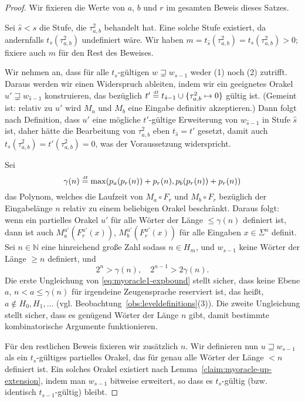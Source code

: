 \begin{proof}
Wir fixieren die Werte von $a$, $b$ und $r$ im gesamten Beweis dieses Satzes.

Sei $\hat{s} < s$ die Stufe, die $\tau^2_{a,b}$ behandelt hat.
Eine solche Stufe existiert, da andernfalls $t_{s}(\tau^2_{a,b})$ undefiniert wäre.
Wir haben $m = t_{\hat{s}}(\tau^2_{a,b}) = t_{s}(\tau^2_{a,b})>0$; fixiere auch $m$ für den Rest des Beweises.

Wir nehmen an, dass für alle $t_{s}$-gültigen $w\sqsupsetneq w_{s-1}$ weder (1) noch (2) zutrifft.
Daraus werden wir einen Widerspruch ableiten, indem wir ein geeignetes Orakel $u'\sqsupsetneq w_{\hat{s}-1}$ konstruieren, das bezüglich $t' \stackrel{\text{{\normalfont\tiny df}}}{=}  t_{\hat{s}-1}\cup \{\tau^2_{a,b}\mapsto 0\}$ gültig ist. (Gemeint ist: relativ zu $u'$ wird $M_a$ und $M_b$ eine Eingabe definitiv akzeptieren.)
Dann folgt nach Definition, dass $u'$ eine mögliche $t'$-gültige Erweiterung von $w_{\hat{s}-1}$ in Stufe $\hat{s}$ ist, daher hätte die Bearbeitung von $\tau^2_{a,b}$ eben $t_{\hat{s}}=t'$ gesetzt, damit auch $t_{s}(\tau^2_{a,b})=t'(\tau^2_{a,b})=0$, was der Voraussetzung widerspricht.

Sei
\begin{equation*} \gamma(n) \stackrel{\text{{\normalfont\tiny df}}}{=}  \max(p_a(p_r(n))+p_r(n), p_b(p_r(n))+p_r(n)) \end{equation*}
das Polynom, welches die Laufzeit von $M_a\circ F_r$ und $M_b\circ F_r$ bezüglich der Eingabelänge $n$ relativ zu einem beliebigen Orakel beschränkt.
Daraus folgt: wenn ein partielles Orakel $u'$ für alle Wörter der Länge $\leq \gamma(n)$ definiert ist, dann ist auch $M_a^{u'}(F_r^{u'}(x))$, $M_b^{u'}(F_r^{u'}(x))$ für alle Eingaben $x\in\Sigma^n$ definit.
Sei $n\in\mathbb N$ eine hinreichend große Zahl sodass $n\in H_m$, und $w_{s-1}$ keine Wörter der Länge $\geq n$ definiert,
und
\begin{equation}\label{eq:myoracle1-expbound}
    2^n > \gamma(n),\quad  2^{n-1} > 2\gamma(n).
\end{equation}
Die erste Ungleichung von \eqref{eq:myoracle1-expbound} stellt sicher, dass keine Ebene $a$, $n<a\leq \gamma(n)$ für irgendeine Zeugensprache reserviert ist, das heißt, $a\not\in H_0, H_1, \dots$ (vgl. Beobachtung~\ref{obs:leveldefinitions}(3)). Die zweite Ungleichung stellt sicher, dass es genügend Wörter der Länge $n$ gibt, damit bestimmte kombinatorische Argumente funktionieren.

Für den restlichen Beweis fixieren wir zusätzlich $n$.
Wir definieren nun $u\sqsupseteq w_{s-1}$ als ein $t_{s}$-gültiges partielles Orakel, das für genau alle Wörter der Länge $<n$ definiert ist. Ein solches Orakel existiert nach Lemma~\ref{claim:myoracle-up-extension}, indem man $w_{s-1}$ bitweise erweitert, so dass es $t_{s}$-gültig (bzw. identisch $t_{s-1}$-gültig) bleibt.


\end{proof}
